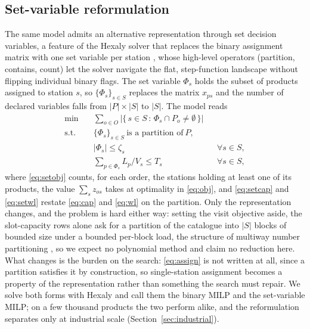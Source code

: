 \documentclass[]{interact}
\begin{document}
\subsection{Set-variable reformulation}\label{sec:setvar}
The same model admits an alternative representation through set decision variables, a feature of the Hexaly solver that replaces the binary assignment matrix with one set variable per station \citep{blaisemodeling}, whose high-level operators (partition, contains, count) let the solver navigate the flat, step-function landscape without flipping individual binary flags. The set variable $\Phi_s$ holds the subset of products assigned to station $s$, so $\{\Phi_s\}_{s \in S}$ replaces the matrix $x_{ps}$ and the number of declared variables falls from $|P|\times|S|$ to $|S|$. The model reads
\begin{align}
\min \quad & \sum_{o \in O} \bigl|\{\, s \in S \,:\, \Phi_s \cap P_o \neq \emptyset \,\}\bigr| \label{eq:setobj}\\
\text{s.t.} \quad & \{\Phi_s\}_{s \in S}\ \text{is a partition of}\ P, \label{eq:setpart}\\
& |\Phi_s| \le \zeta_s && \forall s \in S, \label{eq:setcap}\\
& \sum_{p \in \Phi_s} L_p / V_s \le T_s && \forall s \in S, \label{eq:setwl}
\end{align}
where \eqref{eq:setobj} counts, for each order, the stations holding at least one of its products, the value $\sum_{s} z_{os}$ takes at optimality in \eqref{eq:obj}, and \eqref{eq:setcap} and \eqref{eq:setwl} restate \eqref{eq:cap} and \eqref{eq:wl} on the partition. Only the representation changes, and the problem is hard either way: setting the visit objective aside, the slot-capacity rows alone ask for a partition of the catalogue into $|S|$ blocks of bounded size under a bounded per-block load, the structure of multiway number partitioning \citep{garey1979computers}, so we expect no polynomial method and claim no reduction here. What changes is the burden on the search: \eqref{eq:assign} is not written at all, since a partition satisfies it by construction, so single-station assignment becomes a property of the representation rather than something the search must repair. We solve both forms with Hexaly and call them the binary MILP and the set-variable MILP; on a few thousand products the two perform alike, and the reformulation separates only at industrial scale (Section~\ref{sec:industrial}).

\end{document}
